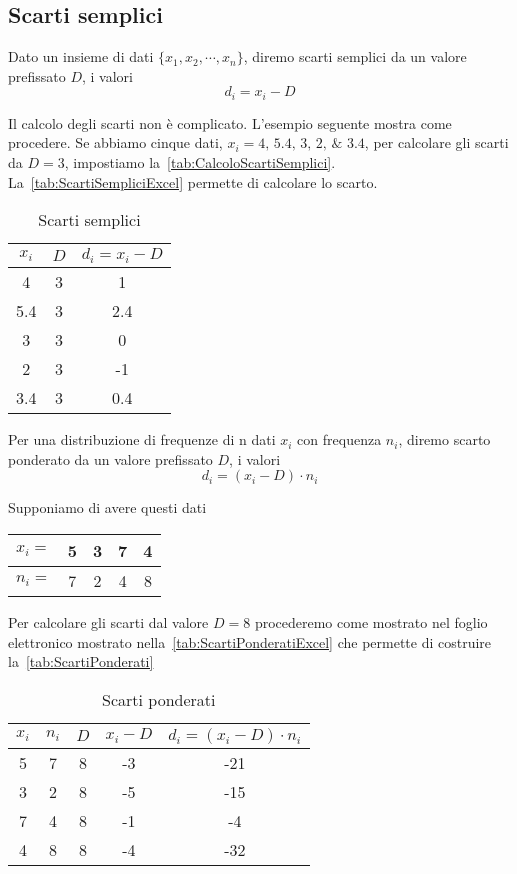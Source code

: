 \subsection{Scarti semplici}
\begin{defn}
Dato un insieme di dati  $\lbrace x_{1},x_{2},\cdots,x_{n}\rbrace$, diremo scarti semplici da un valore prefissato $D$,  i valori \[d_{i}=x_{i}-D \]
\end{defn}
Il calcolo degli scarti non è complicato. L'esempio seguente mostra come procedere. Se abbiamo cinque dati, $x_{i}=\numlist{4;5.4;3;2;3.4}$, per calcolare gli scarti da $D=3$, impostiamo  la~\vref{tab:CalcoloScartiSemplici}. La~\vref{tab:ScartiSempliciExcel} permette di calcolare lo scarto. 
\begin{table}
	\centering
	\begin{tabular}{S[table-format=1.1]S[table-format=1.0]S[table-format=1.1]}
		\toprule
		{$x_{i}$}& {$D$} &{$d_{i}=x_{i}-D$}  \\ 
		&  3& 1 \\ 
		5.4& 3 &2.4  \\ 
		3&  3& 0 \\ 
		2&  3& -1 \\ 
		3.4&3 &0.4\\
		\bottomrule
	\end{tabular} 
	\caption{Scarti semplici}
	\label{tab:CalcoloScartiSemplici}
\end{table}
\begin{defn}
Per una distribuzione di frequenze di n dati  $x_{i}$ con frequenza  $n_{i}$,  diremo scarto ponderato da un valore prefissato $D$,  i valori \[d_{i}=(x_{i}-D)\cdot n_{i} \]
\end{defn}
Supponiamo di avere questi dati 
\begin{center}
	\begin{tabular}{l*{4} {S[table-format=1.0]}}
		{$x_{i}=$}	&5  &3  &7  &4  \\
		\midrule 
		{$n_{i}=$}	& 7 &2  & 4 & 8 \\ 
	\end{tabular}
\end{center}
Per calcolare gli  scarti dal valore $D=8$  procederemo come mostrato nel foglio elettronico mostrato nella~\vref*{tab:ScartiPonderatiExcel} che permette di costruire la~\vref{tab:ScartiPonderati}
\begin{table}
	\centering
	\begin{tabular}{*{4} {S[table-format=1.0]}S[table-format=2.0]}
		\toprule
		{$x_{i}$} & {$n_{i}$ } & {$D$} & {$x_{i}-D $} & {$d_{i}=(x_{i}-D ) \cdot n_{i}$} \\ 
		& 7 &8  & -3 & -21 \\ 
		3&  2& 8 &  -5& -15 \\ 
		7&  4& 8 &  -1&  -4\\ 
		4&  8& 8 & -4 & -32 \\ 
		\bottomrule
	\end{tabular} 
	\caption{Scarti ponderati}
	\label{tab:ScartiPonderati}
\end{table}


